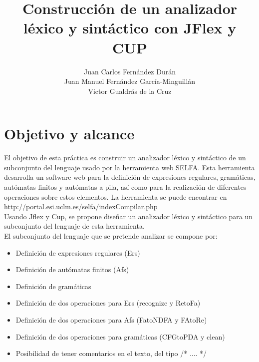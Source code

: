 \documentclass{llncs}
\begin{document}
\title{Construcción de un analizador léxico y sintáctico con JFlex y CUP}
%

\author{Juan Carlos Fernández Durán\\
Juan Manuel Fernández García-Minguillán\\
Victor Gualdrás de la Cruz}


\maketitle              %
\newpage

\tableofcontents
\newpage

\section{Objetivo y alcance}

El objetivo de esta práctica es construir un analizador léxico y sintáctico de un subconjunto del lenguaje usado por la
herramienta web SELFA. Esta herramienta desarrolla un software web para la definición de expresiones regulares,
gramáticas, autómatas finitos y autómatas a pila, así como para la realización de diferentes  operaciones sobre estos
elementos. La herramienta se puede encontrar en http://portal.esi.uclm.es/selfa/indexCompilar.php\\

Usando Jflex y Cup, se propone diseñar un analizador léxico y sintáctico para un subconjunto del lenguaje de esta
herramienta.\\

El subconjunto del lenguaje que se pretende analizar se compone por:

\begin{itemize}
  \item
    Definición de expresiones regulares (Ers)
  \item
    Definición de autómatas finitos (Afs)
  \item
    Definición de gramáticas
  \item
    Definición de dos operaciones para Ers (recognize y RetoFa)
  \item
    Definición de dos operaciones para Afs (FatoNDFA y FAtoRe)
  \item
    Definición de dos operaciones para gramáticas (CFGtoPDA y clean)
  \item
    Posibilidad de tener comentarios en el texto, del tipo /* .... */
\end{itemize}
\end{document}
